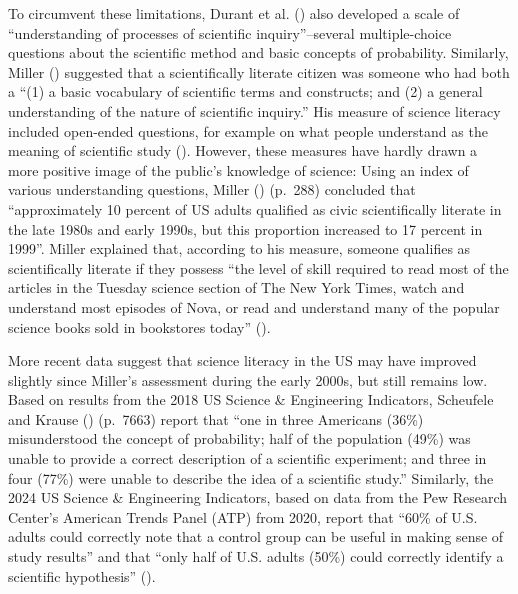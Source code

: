 \documentclass[
  jou,
  floatsintext,
  longtable,
  nolmodern,
  notxfonts,
  notimes,
  colorlinks=true,linkcolor=blue,citecolor=blue,urlcolor=blue]{apa7}
\begin{document}
To circumvent these limitations, Durant et al.
() also
developed a scale of ``understanding of processes of scientific
inquiry''--several multiple-choice questions about the scientific method
and basic concepts of probability. Similarly, Miller
() suggested
that a scientifically literate citizen was someone who had both a ``(1)
a basic vocabulary of scientific terms and constructs; and (2) a general
understanding of the nature of scientific inquiry.'' His measure of
science literacy included open-ended questions, for example on what
people understand as the meaning of scientific study
().
However, these measures have hardly drawn a more positive image of the
public's knowledge of science: Using an index of various understanding
questions, Miller
() (p.~288)
concluded that ``approximately 10 percent of US adults qualified as
civic scientifically literate in the late 1980s and early 1990s, but
this proportion increased to 17 percent in 1999''. Miller explained
that, according to his measure, someone qualifies as scientifically
literate if they possess ``the level of skill required to read most of
the articles in the Tuesday science section of The New York Times, watch
and understand most episodes of Nova, or read and understand many of the
popular science books sold in bookstores today''
().

More recent data suggest that science literacy in the US may have
improved slightly since Miller's assessment during the early 2000s, but
still remains low. Based on results from the 2018 US Science \&
Engineering Indicators, Scheufele and Krause
()
(p.~7663) report that ``one in three Americans (36\%) misunderstood the
concept of probability; half of the population (49\%) was unable to
provide a correct description of a scientific experiment; and three in
four (77\%) were unable to describe the idea of a scientific study.''
Similarly, the 2024 US Science \& Engineering Indicators, based on data
from the Pew Research Center's American Trends Panel (ATP) from 2020,
report that ``60\% of U.S. adults could correctly note that a control
group can be useful in making sense of study results'' and that ``only
half of U.S. adults (50\%) could correctly identify a scientific
hypothesis''
().
\end{document}
